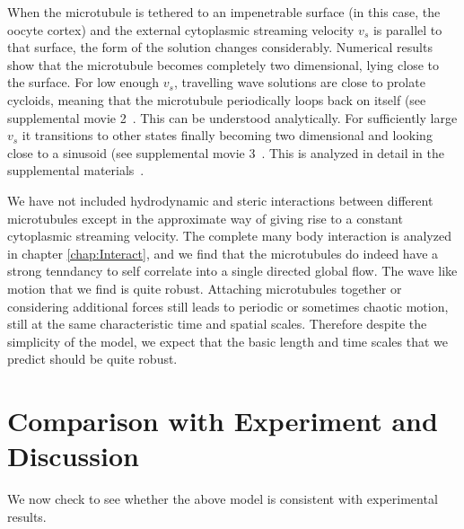 \documentclass[11pt]{ucthesis}
\begin{document}
When the microtubule is tethered to an impenetrable surface (in this case, the oocyte cortex) and the external cytoplasmic streaming velocity $v_s$
is parallel to that surface, the form of the solution changes considerably. Numerical results show that the microtubule becomes completely two dimensional,
lying close to the surface. For low enough $v_s$, travelling wave
solutions are close to prolate cycloids, meaning that the microtubule periodically loops back
on itself (see supplemental movie 2~\cite{SupplMovies}. This can be understood analytically. For sufficiently large $v_s$ it transitions to other states finally becoming 
two dimensional and looking close to a sinusoid (see supplemental movie 3~\cite{SupplMovies}. This is analyzed in detail in
the supplemental materials~\cite{SupplMat}.

We have not included hydrodynamic and steric interactions between
different microtubules except in the approximate way of giving rise to
a constant cytoplasmic streaming velocity. 
The complete many body interaction is analyzed in chapter \ref{chap:Interact}, and we find that the microtubules do indeed have a strong tenndancy to self correlate into a single directed global flow. 
The wave like motion that we find is quite robust. Attaching microtubules together or
considering additional forces still leads to periodic or sometimes chaotic
motion, still at the same characteristic time and spatial scales. Therefore
despite the simplicity of the model, we expect that the basic length
and time scales that we predict should be quite robust.

\section{Comparison with Experiment and Discussion}

We now check to see whether the above model is consistent with experimental
results.  
\end{document}
